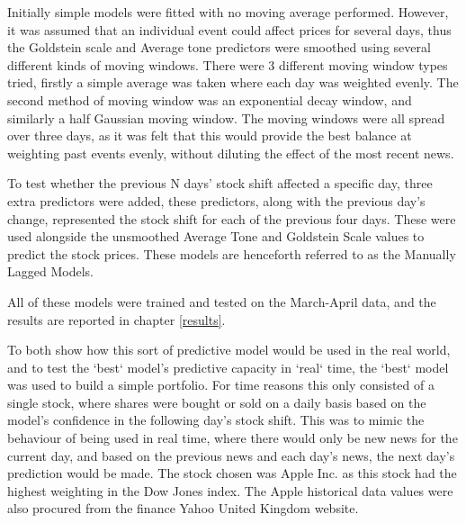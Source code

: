 Initially simple models were fitted with no moving average performed. However, it was assumed that an individual event could affect prices for several days, thus the Goldstein scale and Average tone predictors were smoothed using several different kinds of moving windows. There were 3 different moving window types tried, firstly a simple average was taken where each day was weighted evenly. The second method of moving window was an exponential decay window, and similarly a half Gaussian moving window. The moving windows were all spread over three days, as it was felt that this would provide the best balance at weighting past events evenly, without diluting the effect of the most recent news.

To test whether the previous N days' stock shift affected a specific day, three extra predictors were added, these predictors, along with the previous day's change, represented the stock shift for each of the previous four days. These were used alongside the unsmoothed Average Tone and Goldstein Scale values to predict the stock prices. These models are henceforth referred to as the Manually Lagged Models.

All of these models were trained and tested on the March-April data, and the results are reported in chapter \ref{results}.

To both show how this sort of predictive model would be used in the real world, and to test the `best` model's predictive capacity in `real` time, the `best` model was used to build a simple portfolio. For time reasons this only consisted of a single stock, where shares were bought or sold on a daily basis based on the model's confidence in the following day's stock shift. This was to mimic the behaviour of being used in real time, where there would only be new news for the current day, and based on the previous news and each day's news, the next day's prediction would be made. The stock chosen was Apple Inc. as this stock had the highest weighting in the Dow Jones index. The Apple historical data values were also procured from the finance Yahoo United Kingdom website. 

